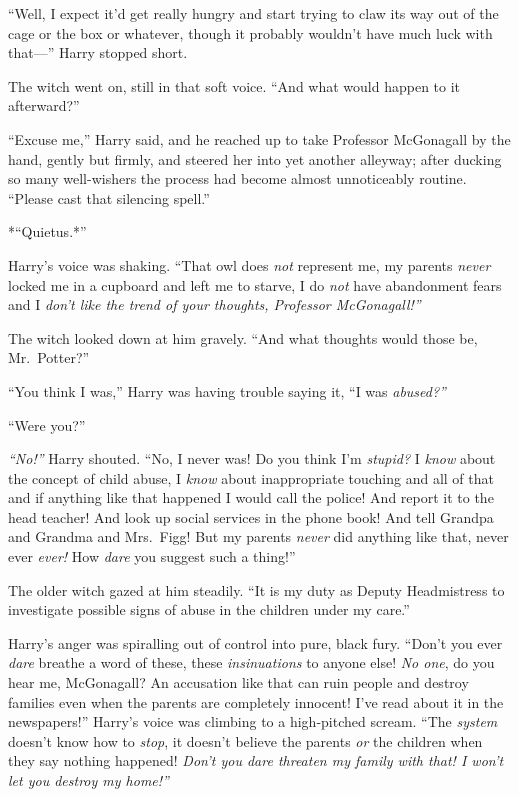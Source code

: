 ``Well, I expect it'd get really hungry and start trying to claw its way
out of the cage or the box or whatever, though it probably wouldn't have
much luck with that---'' Harry stopped short.

The witch went on, still in that soft voice. ``And what would happen to
it afterward?''

``Excuse me,'' Harry said, and he reached up to take Professor
McGonagall by the hand, gently but firmly, and steered her into yet
another alleyway; after ducking so many well-wishers the process had
become almost unnoticeably routine. ``Please cast that silencing
spell.''

*``Quietus.*''

Harry's voice was shaking. ``That owl does \emph{not} represent me, my
parents \emph{never} locked me in a cupboard and left me to starve, I do
\emph{not} have abandonment fears and I \emph{don't like the trend of
your thoughts, Professor McGonagall!''}

The witch looked down at him gravely. ``And what thoughts would those
be, Mr.~Potter?''

``You think I was,'' Harry was having trouble saying it, ``I was
\emph{abused?''}

``Were you?''

\emph{``No!''} Harry shouted. ``No, I never was! Do you think I'm
\emph{stupid?} I \emph{know} about the concept of child abuse, I
\emph{know} about inappropriate touching and all of that and if anything
like that happened I would call the police! And report it to the head
teacher! And look up social services in the phone book! And tell Grandpa
and Grandma and Mrs.~Figg! But my parents \emph{never} did anything like
that, never ever \emph{ever!} How \emph{dare} you suggest such a
thing!''

The older witch gazed at him steadily. ``It is my duty as Deputy
Headmistress to investigate possible signs of abuse in the children
under my care.''

Harry's anger was spiralling out of control into pure, black fury.
``Don't you ever \emph{dare} breathe a word of these, these
\emph{insinuations} to anyone else! \emph{No one}, do you hear me,
McGonagall? An accusation like that can ruin people and destroy families
even when the parents are completely innocent! I've read about it in the
newspapers!'' Harry's voice was climbing to a high-pitched scream. ``The
\emph{system} doesn't know how to \emph{stop}, it doesn't believe the
parents \emph{or} the children when they say nothing happened!
\emph{Don't you dare threaten my family with that! I won't let you
destroy my home!''}

